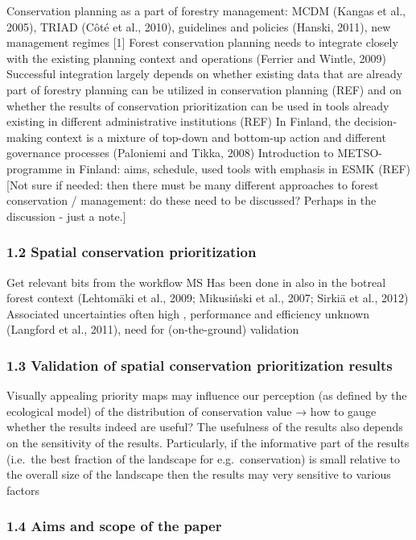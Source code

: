 \documentclass[]{article}
\begin{document}
Conservation planning as a part of forestry management: MCDM (Kangas et
al., 2005), TRIAD (Côté et al., 2010), guidelines and policies (Hanski,
2011), new management regimes {[}1{]} Forest conservation planning needs
to integrate closely with the existing planning context and operations
(Ferrier and Wintle, 2009) Successful integration largely depends on
whether existing data that are already part of forestry planning can be
utilized in conservation planning (REF) and on whether the results of
conservation prioritization can be used in tools already existing in
different administrative institutions (REF) In Finland, the
decision-making context is a mixture of top-down and bottom-up action
and different governance processes (Paloniemi and Tikka, 2008)
Introduction to METSO-programme in Finland: aims, schedule, used tools
with emphasis in ESMK (REF) {[}Not sure if needed: then there must be
many different approaches to forest conservation / management: do these
need to be discussed? Perhaps in the discussion - just a note.{]}

\subsubsection{1.2 Spatial conservation prioritization}

Get relevant bits from the workflow MS Has been done in also in the
botreal forest context (Lehtomäki et al., 2009; Mikusiński et al., 2007;
Sirkiä et al., 2012)⁠ Associated uncertainties often high , performance
and efficiency unknown (Langford et al., 2011), need for (on-the-ground)
validation

\subsubsection{1.3 Validation of spatial conservation prioritization
results}

Visually appealing priority maps may influence our perception (as
defined by the ecological model) of the distribution of conservation
value → how to gauge whether the results indeed are useful? The
usefulness of the results also depends on the sensitivity of the
results. Particularly, if the informative part of the results (i.e.~the
best fraction of the landscape for e.g.~conservation) is small relative
to the overall size of the landscape then the results may very sensitive
to various factors

\subsubsection{1.4 Aims and scope of the paper}
\end{document}
